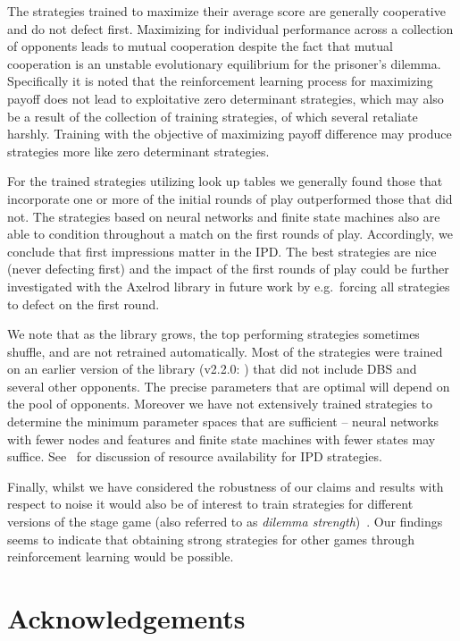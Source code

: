 \documentclass[10pt,letterpaper]{article}
\begin{document}
The strategies trained to maximize their average score are generally
cooperative and do not defect first. Maximizing for individual
performance across a collection of opponents leads to mutual cooperation despite
the fact that mutual cooperation is an unstable evolutionary equilibrium for the prisoner's
dilemma. Specifically it is noted that the reinforcement learning process for maximizing
payoff does not lead to exploitative zero determinant strategies, which may also
be a result of the collection of training strategies, of which several retaliate
harshly. Training with the objective of maximizing payoff difference may
produce strategies more like zero determinant strategies.

For the trained
strategies utilizing look up tables we generally found those that incorporate
one or more of the initial rounds of play outperformed those that did not. The
strategies based on neural networks and finite state machines also are able to
condition throughout a match on the first rounds of play. Accordingly, we conclude
that first impressions matter in the IPD\@. The best strategies are nice (never
defecting first) and the impact of the first rounds of play could be further
investigated with the Axelrod library
in future work by e.g.\ forcing all strategies to defect on the first round.

We note that as the library grows, the top performing strategies
sometimes shuffle, and are not retrained automatically. Most of the strategies were
trained on an earlier version of the library (v2.2.0: \cite{axelrodproject2.2})
that did not include DBS and several other opponents. The precise parameters
that are optimal will depend on the pool of opponents. Moreover we have not
extensively trained strategies to determine the minimum parameter spaces that are
sufficient -- neural networks with fewer nodes and features and finite state
machines with fewer states may suffice. See~\cite{ashlock2013impact} for
discussion of resource availability for IPD strategies.

Finally, whilst we have considered the robustness of our claims and results with
respect to noise it would also be of interest to train strategies for different
versions of the stage game (also referred to as \textit{dilemma
strength})~\cite{wang2015universal, tanimoto2007}. Our findings seems to indicate that obtaining
strong strategies for other games through reinforcement learning would be
possible.

\section*{Acknowledgements}
\end{document}
